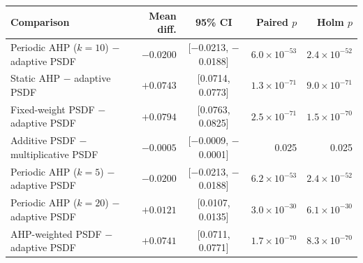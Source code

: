 \begin{tabular}{lrcrr}
\toprule
Comparison & Mean diff. & 95\% CI & Paired $p$ & Holm $p$ \\
\midrule
Periodic AHP ($k=10$) $-$ adaptive PSDF & $-0.0200$ & [$-$0.0213, $-$0.0188] & $6.0\times10^{-53}$ & $2.4\times10^{-52}$ \\
Static AHP $-$ adaptive PSDF & $+0.0743$ & [0.0714, 0.0773] & $1.3\times10^{-71}$ & $9.0\times10^{-71}$ \\
Fixed-weight PSDF $-$ adaptive PSDF & $+0.0794$ & [0.0763, 0.0825] & $2.5\times10^{-71}$ & $1.5\times10^{-70}$ \\
Additive PSDF $-$ multiplicative PSDF & $-0.0005$ & [$-$0.0009, $-$0.0001] & 0.025 & 0.025 \\
Periodic AHP ($k=5$) $-$ adaptive PSDF & $-0.0200$ & [$-$0.0213, $-$0.0188] & $6.2\times10^{-53}$ & $2.4\times10^{-52}$ \\
Periodic AHP ($k=20$) $-$ adaptive PSDF & $+0.0121$ & [0.0107, 0.0135] & $3.0\times10^{-30}$ & $6.1\times10^{-30}$ \\
AHP-weighted PSDF $-$ adaptive PSDF & $+0.0741$ & [0.0711, 0.0771] & $1.7\times10^{-70}$ & $8.3\times10^{-70}$ \\
\bottomrule
\end{tabular}
